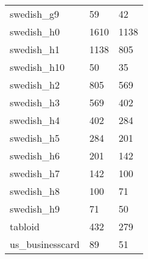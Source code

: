 {\begin{supertabular}{|lll|}
                swedish\_g9 &     59 &     42 \\
                swedish\_h0 &   1610 &   1138 \\
                swedish\_h1 &   1138 &    805 \\
               swedish\_h10 &     50 &     35 \\
                swedish\_h2 &    805 &    569 \\
                swedish\_h3 &    569 &    402 \\
                swedish\_h4 &    402 &    284 \\
                swedish\_h5 &    284 &    201 \\
                swedish\_h6 &    201 &    142 \\
                swedish\_h7 &    142 &    100 \\
                swedish\_h8 &    100 &     71 \\
                swedish\_h9 &     71 &     50 \\
                    tabloid &    432 &    279 \\
           us\_businesscard &     89 &     51 \\
\end{supertabular}
}\onecolumn

